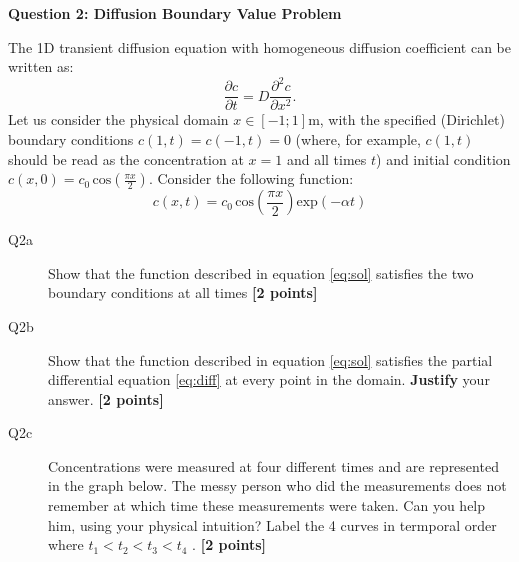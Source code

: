 \documentclass{article}
\begin{document}
\textbf{Question 2: Diffusion Boundary Value Problem}

The 1D transient diffusion equation with homogeneous diffusion coefficient can be written as:
\begin{equation}
\frac{\partial c}{\partial t} = D \frac{\partial^2 c}{\partial x^2}. \label{eq:diff}
\end{equation} Let us consider the physical domain $ x \in \left[ -1 ; 1 \right] \mathrm{m}$, with the specified (Dirichlet) boundary conditions $c(1,t) = c(-1,t) = 0$ (where, for example, $c(1,t)$ should be read as the concentration at $x=1$ and all times $t$) and initial condition $c(x, 0) = c_0 \, \mathrm{cos}\left(\frac{\pi x}{2} \right)$. Consider the following function:
\begin{equation}
c(x,t) = c_0 \, \mathrm{cos}\left(\frac{\pi x}{2} \right) \mathrm{exp}\left(-\alpha t \right)  \label{eq:sol}
\end{equation}



\begin{description}
\item [Q2a] Show that the function described in equation \ref{eq:sol} satisfies the two boundary conditions at all times \textbf{[2 points]}
\vspace{2cm}

\item [Q2b] Show that the function described in equation \ref{eq:sol} satisfies the partial differential equation \ref{eq:diff} at every point in the domain. \textbf{Justify} your answer. \textbf{[2 points]}

\vspace{3cm}





\item [Q2c] Concentrations were measured at four different times and are represented in the graph below. The messy person who did the measurements does not remember at which time these measurements were taken. Can you help him, using your physical intuition? Label the 4 curves in termporal order where $t_1< t_2<t_3<t_4$ .  \textbf{[2 points]}
\end{description}

\end{document}
